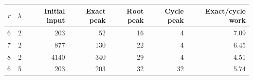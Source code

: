 \begin{tabular}{rrrrrrr}
\toprule
$r$ & $\lambda$ & Initial input & Exact peak & Root peak & Cycle peak & Exact/cycle work\\
\midrule
6 & 2 & 203 & 52 & 16 & 4 & 7.09\\
7 & 2 & 877 & 130 & 22 & 4 & 6.45\\
8 & 2 & 4140 & 340 & 29 & 4 & 4.51\\
6 & 5 & 203 & 203 & 32 & 32 & 5.74\\
\bottomrule
\end{tabular}
